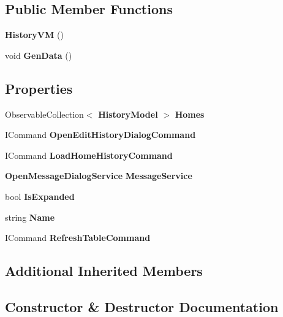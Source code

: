 \subsection*{Public Member Functions}
\begin{DoxyCompactItemize}
\item 
\textbf{ History\+VM} ()
\item 
void \textbf{ Gen\+Data} ()
\end{DoxyCompactItemize}
\subsection*{Properties}
\begin{DoxyCompactItemize}
\item 
Observable\+Collection$<$ \textbf{ History\+Model} $>$ \textbf{ Homes}\hspace{0.3cm}{\ttfamily  [get, set]}
\item 
I\+Command \textbf{ Open\+Edit\+History\+Dialog\+Command}\hspace{0.3cm}{\ttfamily  [get]}
\item 
I\+Command \textbf{ Load\+Home\+History\+Command}\hspace{0.3cm}{\ttfamily  [get]}
\item 
\textbf{ Open\+Message\+Dialog\+Service} \textbf{ Message\+Service}\hspace{0.3cm}{\ttfamily  [get]}
\item 
bool \textbf{ Is\+Expanded}\hspace{0.3cm}{\ttfamily  [get, set]}
\item 
string \textbf{ Name}\hspace{0.3cm}{\ttfamily  [get]}
\item 
I\+Command \textbf{ Refresh\+Table\+Command}\hspace{0.3cm}{\ttfamily  [get]}
\end{DoxyCompactItemize}
\subsection*{Additional Inherited Members}


\subsection{Constructor \& Destructor Documentation}
\mbox{\label{class_a_f_h___scheduler_1_1_history_1_1_history_v_m_a174c521b9867dd07e204219fcddb06d8}} 
